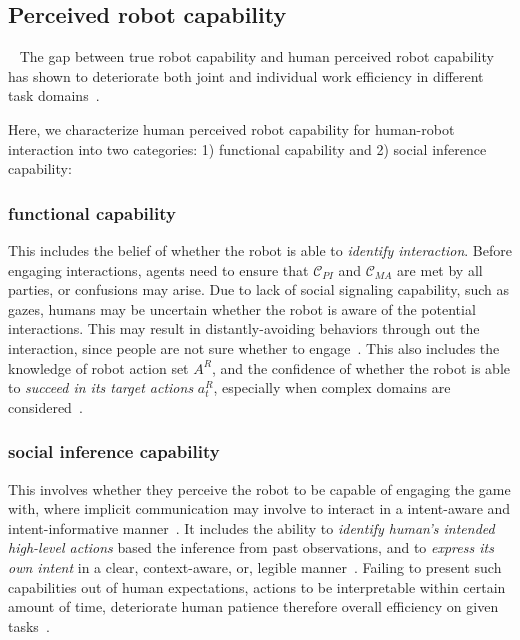 \documentclass[letterpaper, 10 pt, conference]{ieeeconf}  %
\begin{document}
\subsection{Perceived robot capability}~\label{sec:perceived}
The gap between true robot capability and human perceived robot capability  
has shown to deteriorate both joint and individual work efficiency in 
different task domains~\cite{dragan2015effects}. 

Here, we characterize human perceived robot capability for human-robot interaction into two categories: 1) functional capability and 2) social inference capability:

\subsubsection{functional capability}
This includes the belief of whether the robot is able to \textit{identify 
interaction}. Before engaging interactions, agents need to ensure that 
$\mathcal{C}_{PI}$ and $\mathcal{C}_{MA}$ are met by all parties, or 
confusions may arise. Due to lack of social signaling capability, such as gazes, 
humans may be uncertain whether the robot is aware of the potential 
interactions. This may result in distantly-avoiding behaviors through out the interaction, since 
people are not sure whether to engage~\cite{dragan2015effects}.
This also includes the knowledge of robot action set $A^R$, and the confidence of 
whether the robot is able to \textit{succeed in its target actions} $a^R_t$, 
especially when complex domains are considered~\cite{chen2018planning}. 

\subsubsection{social inference capability}
This involves whether they perceive the robot to be capable of engaging the 
game with, where implicit communication may involve to interact in a intent-aware and intent-informative manner~\cite{knepper2017implicit}. It 
includes the ability to
\textit{identify human's intended high-level actions} based the inference from 
past observations, and to \textit{express its own intent} in a clear, 
context-aware, or, legible manner~\cite{dragan2013legibility}. Failing to 
present such capabilities out of human expectations, actions to 
be interpretable within certain amount of time, deteriorate human patience 
therefore overall efficiency on given tasks~\cite{cha2015perceived}. 
\end{document}
